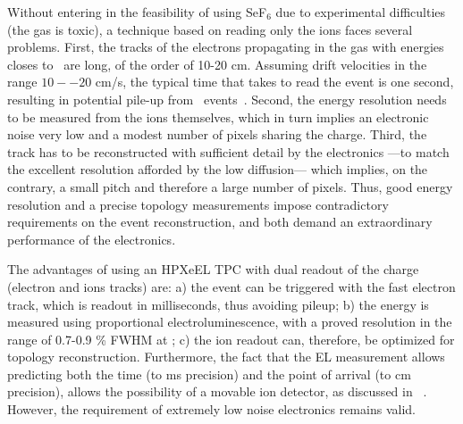 \documentclass[pdflatex,iicol,sn-mathphys-num]{sn-jnl}
\begin{document}
Without entering in the feasibility of using SeF$_6$ due to experimental difficulties (the gas is toxic), a technique based on reading only the ions faces several problems. First, the tracks of the electrons propagating in the gas with energies closes to \Qbb~are long, of the order of 10-20 cm. Assuming drift velocities in the range $10--20$ cm/s, the typical time that takes to read the event is one second, resulting in potential pile-up from \bbtnu\ events~\cite{NnDEx-100:2023alw}. Second, the energy resolution needs to be measured from the ions themselves, which in turn implies an electronic noise very low and a modest number of pixels sharing the charge. Third, the track has to be reconstructed with sufficient detail by the electronics ---to match the excellent resolution afforded by the low diffusion--- which implies, on the contrary, a small pitch and therefore a large number of pixels. Thus, good energy resolution and a precise topology measurements impose contradictory requirements on the event reconstruction, and both demand an extraordinary performance of the electronics. 

The advantages of using an HPXeEL TPC with dual readout of the charge (electron and ions tracks) are: a) the event can be triggered with the fast electron track, which is readout in milliseconds, thus avoiding pileup; b) the energy is measured using proportional electroluminescence, with a proved resolution in the range of 0.7-0.9 \% FWHM at \Qbb; c) the ion readout can, therefore, be optimized for topology reconstruction. Furthermore, the fact that the EL measurement allows predicting both the time (to ms precision) and the point of arrival (to cm precision), allows the possibility of a movable ion detector, as discussed in ~\cite{itaca2026}. However, the requirement of extremely low noise electronics remains valid. 

\end{document}
